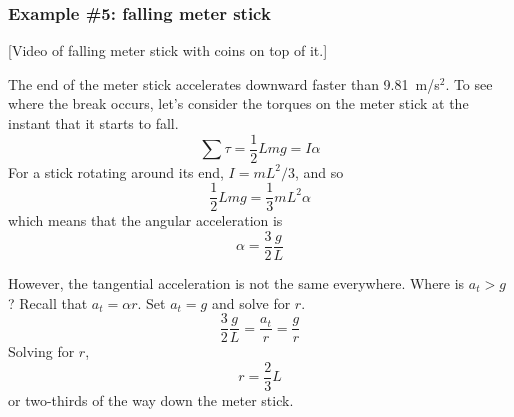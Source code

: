 \subsubsection*{Example \#5: falling meter stick}

[Video of falling meter stick with coins on top of it.]

The end of the meter stick accelerates downward faster than 9.81~m/s$^2$. To see where the break occurs, let's consider the torques on the meter stick at the instant that it starts to fall.
$$\sum \tau = \frac{1}{2}Lmg = I\alpha$$
For a stick rotating around its end, $I=mL^2/3$, and so
$$\frac{1}{2}Lmg = \frac{1}{3}mL^2\alpha$$
which means that the angular acceleration is
$$\alpha=\frac{3}{2}\frac{g}{L}$$

However, the tangential acceleration is not the same everywhere. Where is $a_t>g$? Recall that $a_t=\alpha r$. Set $a_t=g$ and solve for $r$.
$$\frac{3}{2}\frac{g}{L}=\frac{a_t}{r}=\frac{g}{r}$$
Solving for $r$,
$$r=\frac{2}{3}L$$
or two-thirds of the way down the meter stick.
              

\clearpage
